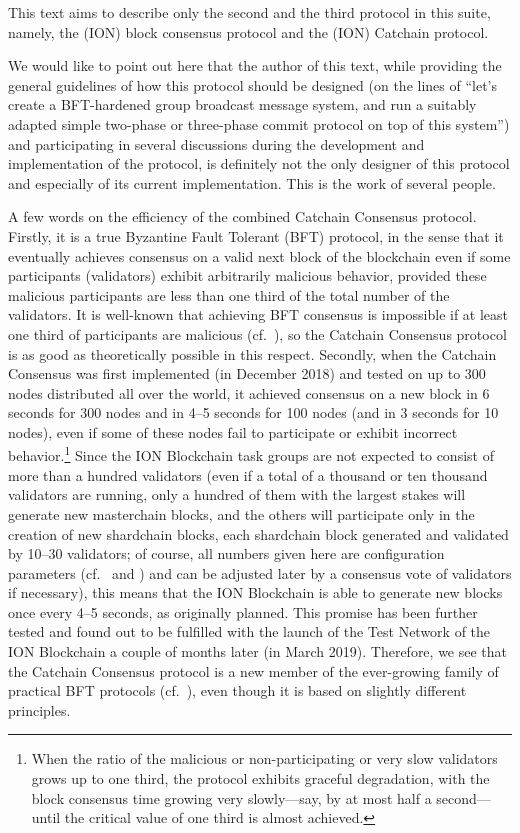 \documentclass[12pt,oneside]{article}
\begin{document}
This text aims to describe only the second and the third protocol in this suite, namely, the (ION) block consensus protocol and the (ION) Catchain protocol.

We would like to point out here that the author of this text, while providing the general guidelines of how this protocol should be designed (on the lines of ``let's create a BFT-hardened group broadcast message system, and run a suitably adapted simple two-phase or three-phase commit protocol on top of this system'') and participating in several discussions during the development and implementation of the protocol, is definitely not the only designer of this protocol and especially of its current implementation. This is the work of several people.

A few words on the efficiency of the combined Catchain Consensus protocol. Firstly, it is a true Byzantine Fault Tolerant (BFT) protocol, in the sense that it eventually achieves consensus on a valid next block of the blockchain even if some participants (validators) exhibit arbitrarily malicious behavior, provided these malicious participants are less than one third of the total number of the validators. It is well-known that achieving BFT consensus is impossible if at least one third of participants are malicious (cf.~\cite{Byzantine}), so the Catchain Consensus protocol is as good as theoretically possible in this respect. Secondly, when the Catchain Consensus was first implemented (in December 2018) and tested on up to 300 nodes distributed all over the world, it achieved consensus on a new block in 6 seconds for 300 nodes and in 4--5 seconds for 100 nodes (and in 3 seconds for 10 nodes), even if some of these nodes fail to participate or exhibit incorrect behavior.\footnote{When the ratio of the malicious or non-participating or very slow validators grows up to one third, the protocol exhibits graceful degradation, with the block consensus time growing very slowly---say, by at most half a second---until the critical value of one third is almost achieved.} Since the ION Blockchain task groups are not expected to consist of more than a hundred validators (even if a total of a thousand or ten thousand validators are running, only a hundred of them with the largest stakes will generate new masterchain blocks, and the others will participate only in the creation of new shardchain blocks, each shardchain block generated and validated by 10--30 validators; of course, all numbers given here are configuration parameters (cf.\ \cite{ION} and \cite{TBC}) and can be adjusted later by a consensus vote of validators if necessary), this means that the ION Blockchain is able to generate new blocks once every 4--5 seconds, as originally planned. This promise has been further tested and found out to be fulfilled with the launch of the Test Network of the ION Blockchain a couple of months later (in March 2019). Therefore, we see that the Catchain Consensus protocol is a new member of the ever-growing family of practical BFT protocols (cf.~\cite{PBFT}), even though it is based on slightly different principles.
\end{document}
